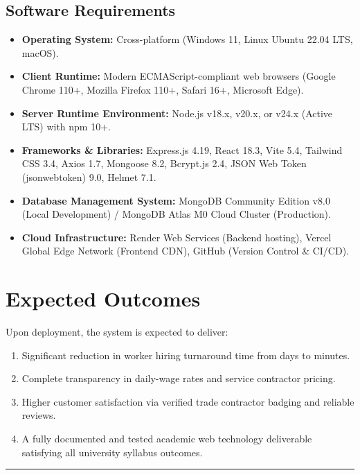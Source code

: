 \subsection{Software Requirements}
\begin{itemize}
    \item \textbf{Operating System:} Cross-platform (Windows 11, Linux Ubuntu 22.04 LTS, macOS).
    \item \textbf{Client Runtime:} Modern ECMAScript-compliant web browsers (Google Chrome 110+, Mozilla Firefox 110+, Safari 16+, Microsoft Edge).
    \item \textbf{Server Runtime Environment:} Node.js v18.x, v20.x, or v24.x (Active LTS) with npm 10+.
    \item \textbf{Frameworks \& Libraries:} Express.js 4.19, React 18.3, Vite 5.4, Tailwind CSS 3.4, Axios 1.7, Mongoose 8.2, Bcrypt.js 2.4, JSON Web Token (jsonwebtoken) 9.0, Helmet 7.1.
    \item \textbf{Database Management System:} MongoDB Community Edition v8.0 (Local Development) / MongoDB Atlas M0 Cloud Cluster (Production).
    \item \textbf{Cloud Infrastructure:} Render Web Services (Backend hosting), Vercel Global Edge Network (Frontend CDN), GitHub (Version Control \& CI/CD).
\end{itemize}

\section{Expected Outcomes}
Upon deployment, the system is expected to deliver:
\begin{enumerate}
    \item Significant reduction in worker hiring turnaround time from days to minutes.
    \item Complete transparency in daily-wage rates and service contractor pricing.
    \item Higher customer satisfaction via verified trade contractor badging and reliable reviews.
    \item A fully documented and tested academic web technology deliverable satisfying all university syllabus outcomes.
\end{enumerate}

\vspace{10mm}
\hrule
